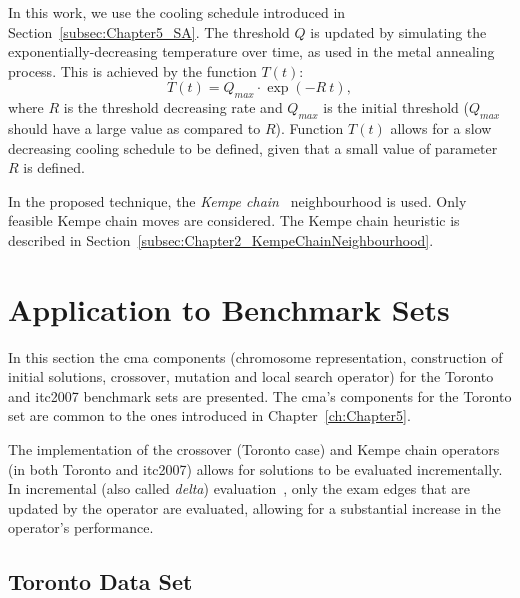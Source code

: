 In this work, we use the cooling schedule introduced in Section~\ref{subsec:Chapter5_SA}. The threshold $Q$ is updated by simulating the exponentially-decreasing temperature over time, as used in the metal annealing process. This is achieved by the function $T(t)$:
\begin{equation}
T(t) = Q_{max} \cdot \exp(- R \: t) ,	\label{eq:TATempDecreasingFunction}
\end{equation}
where $R$ is the threshold decreasing rate and $Q_{max}$ is the initial threshold ($Q_{max}$ should have a large value as compared to $R$). Function $T(t)$ allows for a slow decreasing cooling schedule to be defined, given that a small value of parameter $R$ is defined.

In the proposed technique, the \textit{Kempe chain}~\citep{Thompson1998} neighbourhood is used. Only feasible Kempe chain moves are considered. The Kempe chain heuristic is described in Section~\ref{subsec:Chapter2_KempeChainNeighbourhood}.




%
%
\section{Application to Benchmark Sets}
\label{sec:Chapter6_ApplicationToBenchmarkSets}

In this section the \gls{cma} components (chromosome representation, construction of initial solutions, crossover, mutation and local search operator) for the Toronto and \gls{itc2007} benchmark sets are presented. The \gls{cma}'s components for the Toronto set are common to the ones introduced in Chapter~\ref{ch:Chapter5}.

The implementation of the crossover (Toronto case) and Kempe chain operators (in both Toronto and \gls{itc2007}) allows for solutions to be evaluated incrementally. In incremental (also called \textit{delta}) evaluation~\cite{Corne1994}, only the exam edges that are updated by the operator are evaluated, allowing for a substantial increase in the operator's performance.



\subsection{Toronto Data Set}
\label{sec:Chapter6_ApplicationToToronto}

